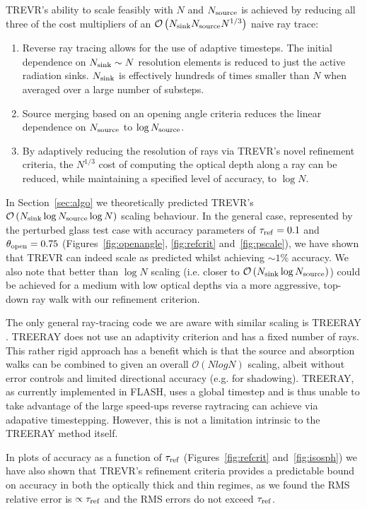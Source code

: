 \documentclass[fleq,usenatbib]{mnras}
\newcommand{\acro}{TREVR}
\newcommand{\bigO}[1]{\mathcal{O}\left(#1\right)}
\newcommand{\NS}{N_{\rm source}}
\newcommand{\NK}{N_{\rm sink}}
\newcommand{\tr}{\tau_{\rm ref}}
\newcommand{\tO}{\theta_{\rm open}}
\begin{document}
{\acro{}'s ability to scale feasibly with $N$ and $\NS$ is achieved by reducing 
all three of the cost multipliers of an $\bigO{\NK \NS N^{1/3}}$ naive ray trace:
\begin{enumerate}
\item Reverse ray tracing allows for the use of adaptive timesteps. The 
initial dependence on $\NK \sim N$ resolution elements is reduced to just the active 
radiation sinks. $\NK$ is effectively hundreds of times smaller than $N$ when averaged
over a large number of substeps.  
\item Source merging based on an opening angle criteria reduces the linear 
dependence on $\NS$ to $\log\NS$.
\item By adaptively reducing the resolution of rays via \acro{}'s novel 
refinement criteria, the $N^{1/3}$ cost of computing the optical depth along a 
ray can be reduced, while maintaining a specified level of accuracy, to 
$\log N$.  
\end{enumerate}

In Section~\ref{sec:algo} we theoretically 
predicted \acro{}'s $\bigO{\NK \log\NS \log N}$ scaling behaviour. In the 
general case, represented by the perturbed glass test case with 
accuracy parameters of $\tr=0.1$ and $\tO=0.75$ (Figures~\ref{fig:openangle}, 
\ref{fig:refcrit} and~\ref{fig:pscale}), we have shown that \acro{} can
indeed scale as predicted whilst achieving $\sim 1\%$ accuracy.  We also note that
better than $\log N$ scaling (i.e. closer to $\bigO{\NK \log\NS}$)
could be achieved for a medium with low optical
depths via a more aggressive, top-down ray walk with our refinement criterion.

The only general ray-tracing code we are aware with similar scaling is TREERAY \citep{HaidEt18}.  TREERAY
does not use an adaptivity criterion and has a fixed number of rays.
This rather rigid approach has a benefit which is that the source and absorption walks can
be combined to given an overall $\bigO{N log N}$ scaling, albeit without error controls and
limited directional accuracy (e.g. for shadowing).
TREERAY, as currently implemented in FLASH, uses a global timestep and is thus unable to take
advantage of the large speed-ups reverse raytracing can achieve via adapative timestepping.
However, this is not a limitation intrinsic to the TREERAY method itself.   

In plots of 
accuracy as a function of $\tr$ (Figures~\ref{fig:refcrit} 
and~\ref{fig:isosph}) we have also shown that \acro{}'s refinement criteria 
provides a predictable bound on accuracy in both the optically thick and thin 
regimes, as we found the RMS relative error is $\propto \tr$ and the RMS 
errors do not exceed $\tr$.  

}
\end{document}
